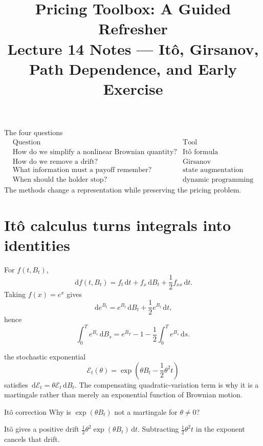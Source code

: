\documentclass[10pt]{article}
\title{\textbf{Pricing Toolbox: A Guided Refresher}\\\large Lecture 14 Notes --- It\^o, Girsanov, Path Dependence, and Early Exercise}
\author{}\date{}
\newcommand{\dd}{\,\mathrm d}\newcommand{\PhiN}{\Phi}
\begin{document}
\maketitle\vspace{-1.4em}
\begin{keyidea}{The four questions}
\[
\begin{array}{c|c}
\text{Question}&\text{Tool}\\\hline
\text{How do we simplify a nonlinear Brownian quantity?}&\text{It\^o formula}\\
\text{How do we remove a drift?}&\text{Girsanov}\\
\text{What information must a payoff remember?}&\text{state augmentation}\\
\text{When should the holder stop?}&\text{dynamic programming}
\end{array}
\]
The methods change a representation while preserving the pricing problem.
\end{keyidea}

\section{It\^o calculus turns integrals into identities}
For \(f(t,B_t)\),
\[
\dd f(t,B_t)=f_t\dd t+f_x\dd B_t+\frac12f_{xx}\dd t.
\]
Taking \(f(x)=e^x\) gives
\[
\dd e^{B_t}=e^{B_t}\dd B_t+\frac12e^{B_t}\dd t,
\]
hence
\[
\boxed{\int_0^T e^{B_s}\dd B_s=e^{B_T}-1-\frac12\int_0^T e^{B_s}\dd s.}
\]
\begin{boardexample}{the stochastic exponential}
\[
\mathcal E_t(\theta)=\exp\left(\theta B_t-\frac12\theta^2t\right)
\]
satisfies \(\dd\mathcal E_t=\theta\mathcal E_t\dd B_t\). The compensating
quadratic-variation term is why it is a martingale rather than merely an
exponential function of Brownian motion.
\end{boardexample}
\begin{studentexercise}{It\^o correction}
Why is \(\exp(\theta B_t)\) not a martingale for \(\theta\ne0\)?
\end{studentexercise}
\begin{shortsolution}
It\^o gives a positive drift
\(\frac12\theta^2\exp(\theta B_t)\dd t\). Subtracting
\(\frac12\theta^2t\) in the exponent cancels that drift.
\end{shortsolution}
\end{document}
